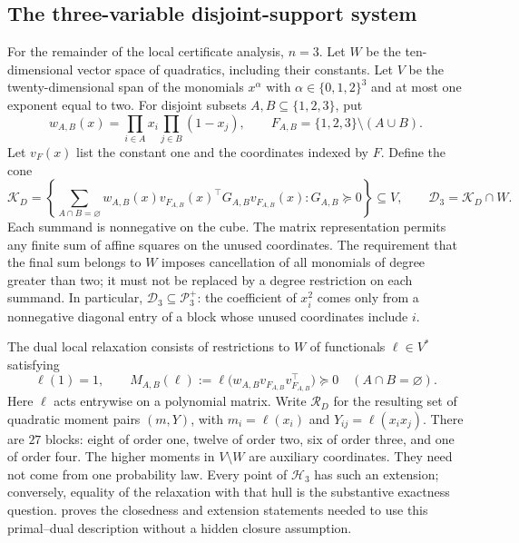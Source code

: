 \subsection{The three-variable disjoint-support system}\label{set:disjoint}
For the remainder of the local certificate analysis, $n=3$. Let $W$ be
the ten-dimensional vector space of quadratics, including their constants.
Let $V$ be the twenty-dimensional span of the monomials $x^\alpha$ with
$\alpha\in\{0,1,2\}^3$ and at most one exponent equal to two. For disjoint
subsets $A,B\subseteq\{1,2,3\}$, put
\[
 w_{A,B}(x)=\prod_{i\in A}x_i\prod_{j\in B}(1-x_j),\qquad
 F_{A,B}=\{1,2,3\}\setminus(A\cup B).
\]
Let $v_F(x)$ list the constant one and the coordinates indexed by $F$.
Define the cone
\begin{equation}\label{eq:set:disjoint}
 \mathcal K_D=\left\{\sum_{A\cap B=\varnothing}
       w_{A,B}(x)v_{F_{A,B}}(x)^\top G_{A,B}v_{F_{A,B}}(x):
       G_{A,B}\succeq0\right\}\subseteq V,
 \qquad \mathcal D_3=\mathcal K_D\cap W.
\end{equation}
Each summand is nonnegative on the cube. The matrix representation permits
any finite sum of affine squares on the unused coordinates. The requirement
that the final sum belongs to $W$ imposes cancellation of all monomials of
degree greater than two; it must not be replaced by a degree restriction on
each summand. In particular, $\mathcal D_3\subseteq\mathcal P_3^+$: the coefficient
of $x_i^2$ comes only from a nonnegative diagonal entry of a block whose
unused coordinates include $i$.

The dual local relaxation consists of restrictions to $W$ of functionals
$\ell\in V^*$ satisfying
\begin{equation}\label{eq:set:localizing}
 \ell(1)=1,\qquad
 M_{A,B}(\ell):=
       \ell\bigl(w_{A,B}v_{F_{A,B}}v_{F_{A,B}}^\top\bigr)\succeq0
       \quad(A\cap B=\varnothing).
\end{equation}
Here $\ell$ acts entrywise on a polynomial matrix. Write $\mathcal R_D$ for the
resulting set of quadratic moment pairs $(m,Y)$, with
$m_i=\ell(x_i)$ and $Y_{ij}=\ell(x_ix_j)$. There are $27$ blocks:
eight of order one, twelve of order two, six of order three, and one of
order four. The higher moments in $V\setminus W$ are auxiliary coordinates.
They need not come from one probability law. Every point of $\mathcal H_3$
has such an extension; conversely, equality of the relaxation with that
hull is the substantive exactness question.  proves the
closedness and extension statements needed to use this primal--dual
description without a hidden closure assumption.

